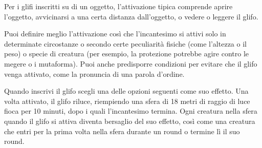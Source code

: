 \begin{multicols}{2}
Per i glifi inscritti su di un oggetto, l'attivazione tipica comprende aprire l'oggetto, avvicinarsi a una certa distanza dall'oggetto, o vedere o leggere il glifo.

Puoi definire meglio l'attivazione così che l'incantesimo si attivi solo in determinate circostanze o secondo certe peculiarità fisiche (come l'altezza o il peso) o specie di creatura (per esempio, la protezione potrebbe agire contro le megere o i mutaforma). Puoi anche predisporre condizioni per evitare che il glifo venga attivato, come la pronuncia di una parola d'ordine.

Quando inscrivi il glifo scegli una delle opzioni seguenti come suo effetto. Una volta attivato, il glifo riluce, riempiendo una sfera di 18 metri di raggio di luce fioca per 10 minuti, dopo i quali l'incantesimo termina. Ogni creatura nella sfera quando il glifo si attiva diventa bersaglio del suo effetto, così come una creatura che entri per la prima volta nella sfera durante un round o termine lì il suo round.


\end{multicols}

